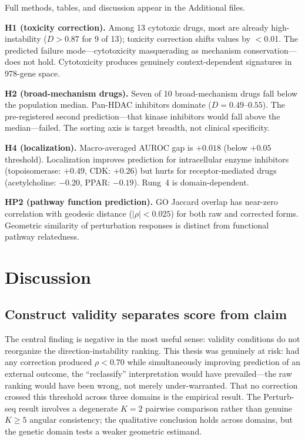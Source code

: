 \documentclass[11pt]{article}
\begin{document}
Full methods, tables, and discussion appear in the Additional files.

\textbf{H1 (toxicity correction).} Among 13 cytotoxic drugs, most are already high-instability ($D > 0.87$
for 9 of 13); toxicity correction shifts values by $<$0.01. The predicted
failure mode---cytotoxicity masquerading as mechanism conservation---does
not hold. Cytotoxicity produces genuinely context-dependent signatures in
978-gene space.

\textbf{H2 (broad-mechanism drugs).} Seven of 10 broad-mechanism drugs fall below the population median.
Pan-HDAC inhibitors dominate ($D = 0.49$--$0.55$). The pre-registered
second prediction---that kinase inhibitors would fall above the
median---failed. The sorting axis is target breadth, not clinical
specificity.

\textbf{H4 (localization).} Macro-averaged AUROC gap is $+0.018$ (below $+0.05$ threshold). Localization
improves prediction for intracellular enzyme inhibitors (topoisomerase:
$+0.49$, CDK: $+0.26$) but hurts for receptor-mediated drugs
(acetylcholine: $-0.20$, PPAR: $-0.19$). Rung~4 is domain-dependent.

\textbf{HP2 (pathway function prediction).} GO Jaccard overlap has near-zero correlation with geodesic distance
($|\rho| < 0.025$) for both raw and corrected forms. Geometric similarity
of perturbation responses is distinct from functional pathway relatedness.

\section{Discussion}

\subsection{Construct validity separates score from claim}

The central finding is negative in the most useful sense: validity conditions
do not reorganize the direction-instability ranking. This thesis was
genuinely at risk: had any correction produced $\rho < 0.70$ while
simultaneously improving prediction of an external outcome, the
``reclassify'' interpretation would have prevailed---the raw ranking
would have been wrong, not merely under-warranted. That no correction
crossed this threshold across three domains is the empirical result.
The Perturb-seq result involves a degenerate $K = 2$ pairwise comparison
rather than genuine $K \geq 5$ angular consistency; the qualitative
conclusion holds across domains, but the genetic domain tests a weaker
geometric estimand.
\end{document}
